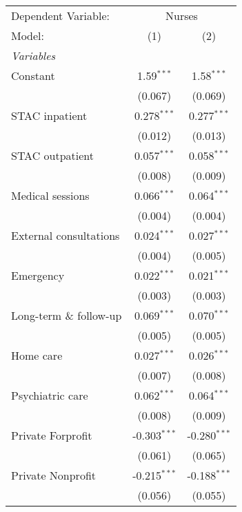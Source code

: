 
\begingroup
\centering
\begin{tabular}{lcc}
   \tabularnewline \midrule \midrule
   Dependent Variable: & \multicolumn{2}{c}{Nurses}\\
   Model:                  & (1)            & (2)\\  
   \midrule
   \emph{Variables}\\
   Constant                & 1.59$^{***}$   & 1.58$^{***}$\\   
                           & (0.067)        & (0.069)\\   
   STAC inpatient          & 0.278$^{***}$  & 0.277$^{***}$\\   
                           & (0.012)        & (0.013)\\   
   STAC outpatient         & 0.057$^{***}$  & 0.058$^{***}$\\   
                           & (0.008)        & (0.009)\\   
   Medical sessions        & 0.066$^{***}$  & 0.064$^{***}$\\   
                           & (0.004)        & (0.004)\\   
   External consultations  & 0.024$^{***}$  & 0.027$^{***}$\\   
                           & (0.004)        & (0.005)\\   
   Emergency               & 0.022$^{***}$  & 0.021$^{***}$\\   
                           & (0.003)        & (0.003)\\   
   Long-term \& follow-up  & 0.069$^{***}$  & 0.070$^{***}$\\   
                           & (0.005)        & (0.005)\\   
   Home care               & 0.027$^{***}$  & 0.026$^{***}$\\   
                           & (0.007)        & (0.008)\\   
   Psychiatric care        & 0.062$^{***}$  & 0.064$^{***}$\\   
                           & (0.008)        & (0.009)\\   
   Private Forprofit       & -0.303$^{***}$ & -0.280$^{***}$\\   
                           & (0.061)        & (0.065)\\   
   Private Nonprofit       & -0.215$^{***}$ & -0.188$^{***}$\\   
                           & (0.056)        & (0.055)\\   

\end{tabular}
